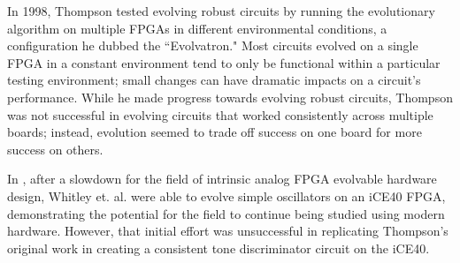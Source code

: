 \documentclass{ieeeaccess}
\begin{document}
In 1998, Thompson tested evolving robust circuits by running the evolutionary algorithm on multiple FPGAs in different environmental conditions, a configuration he dubbed the ``Evolvatron." Most circuits evolved on a single FPGA in a constant environment tend to only be functional within a particular testing environment; small changes can have dramatic impacts on a circuit’s performance. 
While he made progress towards evolving robust circuits, Thompson was not successful in evolving circuits that worked consistently across multiple boards; instead, evolution seemed to trade off success on one board for more success on others.
\cite{Thompson1998OnEvolution}

In \cite{Whitley2021ResurrectingHardware}, after a slowdown for the field of intrinsic analog FPGA evolvable hardware design, Whitley et. al. were able to evolve simple oscillators on an iCE40 FPGA, demonstrating the potential for the field to continue being studied using modern hardware. However, that initial effort was unsuccessful in replicating Thompson's original work in creating a consistent tone discriminator circuit on the iCE40.
\end{document}
